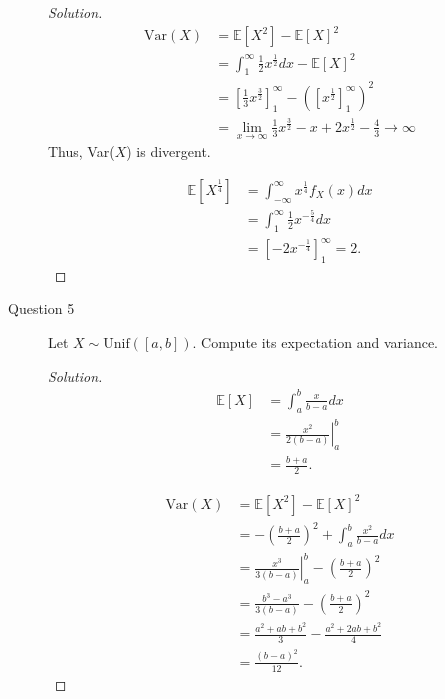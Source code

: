 \documentclass[addpoints, 11pt]{exam}
\newcommand*{\E}{\mathds{E}}
\begin{document}
\begin{description}
\begin{proof}[Solution]
        \begin{align*}
            \text{Var}(X)
            &= \E[X^2] - \E[X]^2 \\
            &= \int^{\infty}_{1} \frac{1}{2}x^{\frac{1}{2}} dx - \E[X]^2 \\
            &= \left[\frac{1}{3}x^{\frac{3}{2}}\right]^{\infty}_1 - \left(\left[x^{\frac{1}{2}}\right]^{\infty}_1\right)^2 \\
            &= \lim_{x \to \infty} \frac{1}{3}x^{\frac{3}{2}} - x + 2x^{\frac{1}{2}} - \frac{4}{3} \rightarrow \infty
        \end{align*}
        Thus, Var($X$) is divergent.

        \begin{align*}
            \E[X^{\frac{1}{4}}]
            &= \int^{\infty}_{-\infty} x^{\frac{1}{4}}f_X(x) dx \\
            &= \int^{\infty}_1 \frac{1}{2}x^{-\frac{5}{4}} dx \\
            &= \left[-2x^{-\frac{1}{4}}\right]^{\infty}_1 = 2.
        \end{align*}
    \end{proof}

    \newpage

    \item[Question 5] Let $X \sim \text{Unif}([a, b])$. Compute its expectation and variance.

    \begin{proof}[Solution]
        \begin{align*}
            \E[X]
            &= \int^b_a \frac{x}{b - a} dx \\
            &= \left.\frac{x^2}{2(b - a)}\right|^b_a \\
            &= \frac{b + a}{2}.
        \end{align*}

        \begin{align*}
            \text{Var}(X) 
            &= \E[X^2] - \E[X]^2 \\
            &= -\left(\frac{b + a}{2}\right)^2 + \int^b_a \frac{x^2}{b - a} dx \\
            &= \left.\frac{x^3}{3(b - a)}\right|^b_a - \left(\frac{b + a}{2}\right)^2 \\
            &= \frac{b^3 - a^3}{3(b - a)} - \left(\frac{b + a}{2}\right)^2 \\
            &= \frac{a^2 + ab + b^2}{3} - \frac{a^2 + 2ab + b^2}{4} \\
            &= \frac{(b - a)^2}{12}.
        \end{align*}
    \end{proof}


\end{description}
\end{document}
